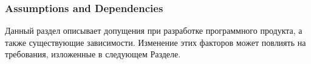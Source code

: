 \subsubsection{Assumptions and Dependencies}

Данный раздел описывает допущения при разработке программного продукта, а также существующие зависимости. Изменение этих факторов может повлиять на требования, изложенные в следующем Разделе.



